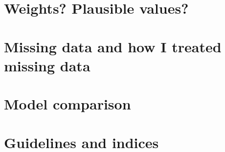 \documentclass[a4paper,11pt,UKenglish,twoside,openright]{report}\usepackage[]{graphicx}\usepackage[]{color}
\begin{document}
\section{Weights? Plausible values?}

\section{Missing data and how I treated missing data}

\section{Model comparison}

\section{Guidelines and indices}




\newpage
\begin{singlespace}
    \printbibliography[title=References]
\end{singlespace}





\begin{appendices}
%    
%    
%    
    
%    
%    
\end{appendices}

\cleardoublepage
{}
{}
\printindex[a]

\cleardoublepage
{}
{}
\printindex
\end{document}
